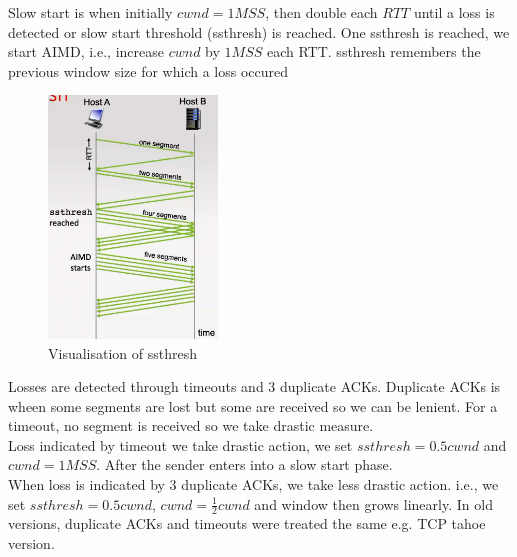 \documentclass[a4paper]{article}
\theoremstyle{plain}
\theoremstyle{definition}
\newtheorem{defn}{Definition}[section]
\theoremstyle{remark}
\begin{document}
\begin{tcolorbox}[colback=black!3!white,colframe=black!60!white,title=\begin{defn}TCP Slow Start and ssthresh \label{TCP Slow Start and ssthresh}\end{defn}]
Slow start is when initially $cwnd=1MSS$, then double each $RTT$ until a loss is detected or slow start threshold (ssthresh) is reached. One ssthresh is reached, we start AIMD, i.e., increase $cwnd$ by $1MSS$ each RTT. ssthresh remembers the previous window size for which a loss occured
\begin{figure}[H]
	\centering
	\includegraphics[width=0.4\textwidth]{sixtysix.png}
	\caption{Visualisation of ssthresh}
	\label{fig:sixtysix-png}
\end{figure}
\end{tcolorbox}
\begin{tcolorbox}[colback=black!3!white,colframe=black!60!white,title=\begin{defn}Reacting Losses: timeout and duplicate ACKs \label{Reacting Losses: timeout and duplicate ACKs}\end{defn}]
Losses are detected through timeouts and 3 duplicate ACKs. Duplicate ACKs is wheen some segments are lost but some are received so we can be lenient. For a timeout, no segment is received so we take drastic measure. \\
Loss indicated by timeout we take drastic action, we set $ssthresh=0.5cwnd$ and $cwnd=1MSS$. After the sender enters into a slow start phase. \\
When loss is indicated by 3 duplicate ACKs, we take less drastic action. i.e., we set $ssthresh=0.5cwnd$, $cwnd=\frac{1}{2}cwnd$ and window then grows linearly. In old versions, duplicate ACKs and timeouts were treated the same e.g. TCP tahoe version.
\end{tcolorbox}
\end{document}

